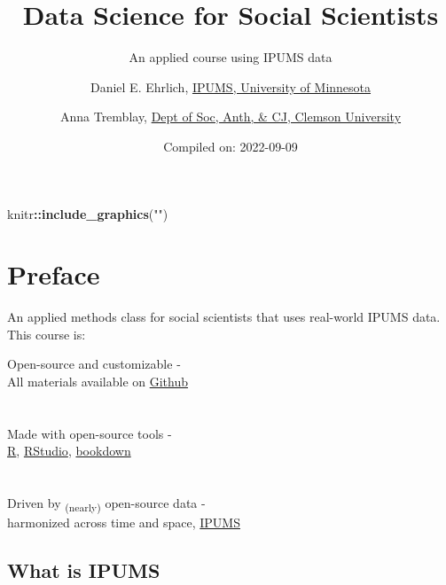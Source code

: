 \documentclass[
]{book}
\title{Data Science for Social Scientists}
\subtitle{An applied course using IPUMS data}
\author{Daniel E. Ehrlich, \href{https://international.ipums.org/international/}{IPUMS, University of Minnesota} \and Anna Tremblay, \href{https://www.clemson.edu/cbshs/departments/sacj/degrees/anthropology.html}{Dept of Soc, Anth, \& CJ, Clemson University}}
\date{Compiled on: 2022-09-09}
\newenvironment{Shaded}{\begin{snugshade}}{\end{snugshade}}
\newcommand{\KeywordTok}[1]{\textcolor[rgb]{0.13,0.29,0.53}{\textbf{#1}}}
\newcommand{\NormalTok}[1]{#1}
\newcommand{\OperatorTok}[1]{\textcolor[rgb]{0.81,0.36,0.00}{\textbf{#1}}}
\newcommand{\StringTok}[1]{\textcolor[rgb]{0.31,0.60,0.02}{#1}}
\begin{document}
\maketitle

{
\setcounter{tocdepth}{1}
\tableofcontents
}
\begin{Shaded}
\begin{Highlighting}[]
\NormalTok{knitr}\OperatorTok{::}\KeywordTok{include_graphics}\NormalTok{(}\StringTok{""}\NormalTok{)}
\end{Highlighting}
\end{Shaded}

\hypertarget{preface}{%
\chapter*{Preface}\label{preface}}

An applied methods class for social scientists that uses real-world IPUMS data. This course is:

Open-source and customizable -\\
\hspace*{0.333em}\hspace*{0.333em}\hspace*{0.333em}All materials available on \href{https://github.com/ehrlichd/stats_book}{Github}\\
~\\
~\\
Made with open-source tools -\\
\hspace*{0.333em}\hspace*{0.333em}\href{https://cran.r-project.org/}{R}, \href{https://www.rstudio.com/products/rstudio/}{RStudio}, \href{https://bookdown.org/}{bookdown}\\
~\\
~\\
Driven by \textsubscript{(nearly)} open-source data -\\
\hspace*{0.333em}\hspace*{0.333em}harmonized across time and space, \href{https://ipums.org}{IPUMS}

\hypertarget{what-is-ipums}{%
\section*{What is IPUMS}\label{what-is-ipums}}
\end{document}
